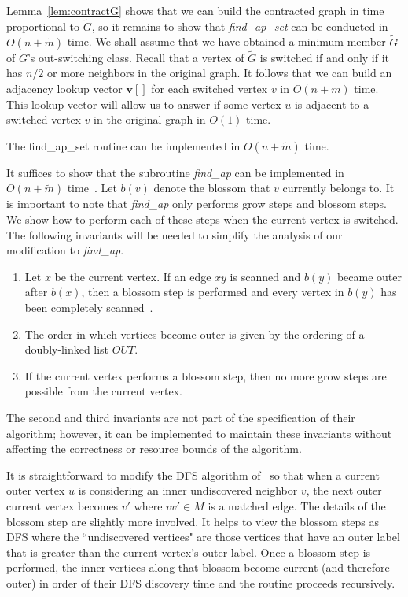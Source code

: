 \documentclass{llncs}
\begin{document}
Lemma~\ref{lem:contractG} shows that we can build the contracted graph in time proportional to $\widetilde{G}$, so it remains to show that \emph{find\_ap\_set} can be conducted in $O(n+\widetilde{m})$ time.  We shall assume that we have obtained a minimum member $\widetilde{G}$ of $G$'s out-switching class.  Recall that a vertex of $\widetilde{G}$ is switched if and only if it has $n/2$ or more neighbors in the original graph.  It follows that we can build an adjacency lookup vector $\mathbf{v}[]$ for each switched vertex $v$ in $O(n+m)$ time.  This lookup vector will allow us to answer if some vertex $u$ is adjacent to a switched vertex $v$ in the original graph in $O(1)$ time. 

\begin{lemma}
The find\_ap\_set routine can be implemented in $O(n + \widetilde{m})$ time.
\end{lemma}

\noindent It suffices to show that the subroutine \emph{find\_ap} can be implemented in $O(n+\widetilde{m})$ time~\cite{GabowT91}.  Let $b(v)$ denote the blossom that $v$ currently belongs to.  It is important to note that \emph{find\_ap} only performs grow steps and blossom steps.  We show how to perform each of these steps when the current vertex is switched.  The following invariants will be needed to simplify the analysis of our modification to \emph{find\_ap}.

\begin{enumerate}
\item Let $x$ be the current vertex. If an edge $xy$ is scanned and $b(y)$ became outer after $b(x)$, then a blossom step is performed and every vertex in $b(y)$ has been completely scanned~\cite{GabowT91}.
\item The order in which vertices become outer is given by the ordering of a doubly-linked list $OUT$.
\item If the current vertex performs a blossom step, then no more grow steps are possible from the current vertex.
\end{enumerate}
The second and third invariants are not part of the specification of their algorithm; however, it can be implemented to maintain these invariants without affecting the correctness or resource bounds of the algorithm. 

It is straightforward to modify the DFS algorithm of~\cite{LindzeyO13} so that when a current outer vertex $u$ is considering an inner undiscovered neighbor $v$, the next outer current vertex becomes $v'$ where $vv' \in M$ is a matched edge.  The details of the blossom step are slightly more involved.  It helps to view the blossom steps as DFS where the ``undiscovered vertices" are those vertices that have an outer label that is greater than the current vertex's outer label.  Once a blossom step is performed, the inner vertices along that blossom become current (and therefore outer) in order of their DFS discovery time and the routine proceeds recursively.
\end{document}
